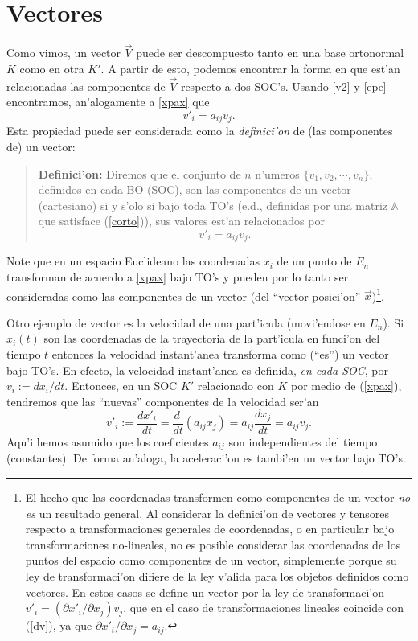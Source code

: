 \section{Vectores}
Como vimos, un vector $\vec{V}$ puede ser descompuesto tanto en una base ortonormal $K$ como en otra $K'$. A partir de esto, podemos encontrar la forma en que est'an relacionadas las componentes de $\vec{V}$ respecto a dos SOC's. Usando \eqref{v2} y \eqref{epe} encontramos, an'alogamente a \eqref{xpax} que
\begin{equation}
v'_i=a_{ij}v_j.
\end{equation}
Esta propiedad puede ser considerada como la \textit{definici'on} de (las componentes de) un vector: 
\begin{quotation}
\textbf{Definici'on:} Diremos que el conjunto de $n$ n'umeros $\lbrace v_1, v_2,\cdots, v_n\rbrace$, definidos en cada BO (SOC), son las componentes de un vector (cartesiano) si y s'olo si bajo toda TO's (e.d., definidas por una matriz $\mathbb{A}$ que satisface (\ref{corto})), sus valores est'an relacionados por 
\begin{equation}\label{dv}
\boxed{v'_i=a_{ij}v_j.}
\end{equation}
\end{quotation}
Note que en un espacio Euclideano las coordenadas $x_i$ de un punto de $E_n$ transforman de acuerdo a \eqref{xpax} bajo TO's y pueden por lo tanto ser consideradas como las componentes de un vector (del ``vector posici'on'' $\vec{x}$)\footnote{El hecho que las coordenadas transformen como componentes de un vector \textit{no es} un resultado general. Al considerar la definici'on de vectores y tensores respecto a transformaciones generales de coordenadas, o en particular bajo transformaciones no-lineales, no es posible considerar las coordenadas de los puntos del espacio como componentes de un vector, simplemente porque su ley de transformaci'on difiere de la ley v'alida para los objetos definidos como vectores. En estos casos se define un vector por la ley de transformaci'on $v'_i=({\partial x'_i}/{\partial x_j})v_j$, que en el caso de transformaciones lineales coincide con (\ref{dv}), ya que ${\partial x'_i}/{\partial x_j}=a_{ij}$.}. 


Otro ejemplo de vector es la velocidad de una part'icula (movi'endose en $E_n$). Si $x_i(t)$ son las coordenadas de la trayectoria de la part'icula en funci'on del tiempo $t$ entonces la velocidad instant'anea transforma como (``es'') un vector bajo TO's. En efecto, la velocidad instant'anea es definida, \textit{en cada SOC}, por $v_i:=dx_i/dt$. Entonces, en un SOC $K'$ relacionado con $K$ por medio de (\ref{xpax}), tendremos que las ``nuevas'' componentes de la velocidad ser'an
\begin{equation}
v'_i:=\frac{dx'_i}{dt}=\frac{d\ }{dt}(a_{ij}x_j)=a_{ij}\frac{dx_j}{dt}=a_{ij}v_j.
\end{equation}
Aqu'i hemos asumido que los coeficientes $a_{ij}$ son independientes del tiempo (constantes). De forma an'aloga, la aceleraci'on es tambi'en un vector bajo TO's.

